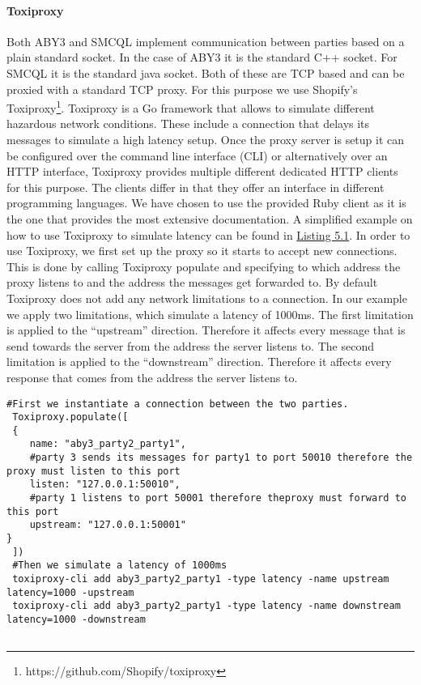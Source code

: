  \paragraph{Toxiproxy}
 Both ABY3 and SMCQL implement communication between parties based on a plain standard socket. In the case of ABY3 it is the standard C++ socket. For SMCQL it is the standard java socket. Both of these are TCP based and can be proxied with a standard TCP proxy. For this purpose we use Shopify's Toxiproxy\footnote{https://github.com/Shopify/toxiproxy}. Toxiproxy is a Go framework that allows to simulate different hazardous network conditions. These include a connection that delays its messages to simulate a high latency setup. Once the proxy server is setup it can be configured over the command line interface (CLI) or alternatively over an HTTP interface, Toxiproxy provides multiple different dedicated HTTP clients for this purpose. The clients differ in that they offer an interface in different programming languages. We have chosen to use the provided Ruby client as it is the one that provides the most extensive documentation. 
 A simplified example on how to use Toxiproxy to simulate latency can be found in \hyperref[the_label]{Listing 5.1}. In order to use Toxiproxy, we first set up the proxy so it starts to accept new connections. This is done by calling Toxiproxy populate and specifying to which address the proxy listens to and the address the messages get forwarded to.
 By default Toxiproxy does not add any network limitations to a connection. In our example we apply two limitations, which simulate a latency of 1000ms. The first limitation is applied to the ``upstream'' direction. Therefore it affects every message that is send towards the server from the address the server listens to. The second limitation is applied to the ``downstream'' direction. Therefore it affects every response that comes from the address the server listens to.    \newpage
 
 
 
 \label{Toxi_label}				
 \begin{lstlisting}[caption={Setting up a proxy that simulates latency between two parties with Toxiporxy}]
 #First we instantiate a connection between the two parties. 
 Toxiproxy.populate([
 {
 	name: "aby3_party2_party1",
 	#party 3 sends its messages for party1 to port 50010 therefore the proxy must listen to this port
 	listen: "127.0.0.1:50010",   
 	#party 1 listens to port 50001 therefore theproxy must forward to this port
 	upstream: "127.0.0.1:50001"  
}
 ])
 #Then we simulate a latency of 1000ms 
 toxiproxy-cli add aby3_party2_party1 -type latency -name upstream latency=1000 -upstream
 toxiproxy-cli add aby3_party2_party1 -type latency -name downstream latency=1000 -downstream
 
 \end{lstlisting}

